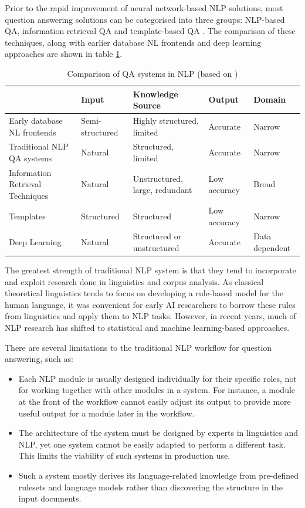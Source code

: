 \documentclass[]{article}
\begin{document}
Prior to the rapid improvement of neural network-based NLP solutions, most question answering solutions can be categorised into three groups: NLP-based QA, information retrieval QA and template-based QA  \cite{andrenucci2005automated}. The comparison of these techniques, along with earlier database NL frontends and deep learning approaches are shown in table \ref{table:comparison}.
\begin{center}
\begin{table}
\begin{tabular}{| p{2.5cm} || p{2cm} | p{2cm} | l | l |}
 \hline
 & Input & Knowledge Source & Output & Domain \\
 \hline
 Early database NL frontends & Semi-structured & Highly structured, limited & Accurate & Narrow \\
 \hline
 Traditional NLP QA systems & Natural & Structured, limited & Accurate & Narrow \\
 \hline
 Information Retrieval Techniques & Natural & Unstructured, large, redundant & Low accuracy & Broad \\
 \hline
 Templates & Structured & Structured & Low accuracy & Narrow \\
 \hline
 Deep Learning & Natural & Structured or unstructured & Accurate & Data dependent \\
 \hline
\end{tabular}
\caption{Comparison of QA systems in NLP (based on \cite{andrenucci2005automated})}\label{table:comparison}
\end{table}
\end{center}

The greatest strength of traditional NLP system is that they tend to incorporate and exploit research done in linguistics and corpus analysis. As classical theoretical linguistics tends to focus on developing a rule-based model for the human language, it was convenient for early AI researchers to borrow these rules from linguistics and apply them to NLP tasks. However, in recent years, much of NLP research has shifted to statistical and machine learning-based approaches.

There are several limitations to the traditional NLP workflow for question answering, such as: 
\begin{itemize}
\item 
Each NLP module is usually designed individually for their specific roles, not for working together with other modules in a system. For instance, a module at the front of the workflow cannot easily adjust its output to provide more useful output for a module later in the workflow. 
\item
The architecture of the system must be designed by experts in linguistics and NLP, yet one system cannot be easily adapted to perform a different task. This limits the viability of such systems in production use.
\item
Such a system mostly derives its language-related knowledge from pre-defined rulesets and language models rather than discovering the structure in the input documents. 
\end{itemize}
\end{document}
